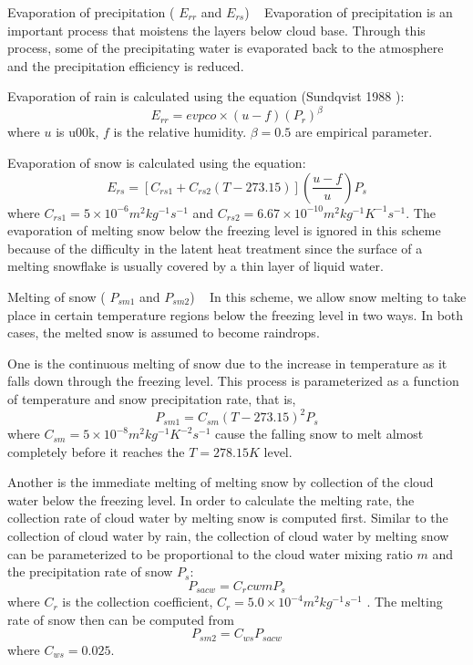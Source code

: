 \begin{DoxyEnumerate}
\begin{DoxyItemize}
\end{DoxyItemize}
\item Evaporation of precipitation ( $E_{rr}$ and $E_{rs}$) ~\newline
 Evaporation of precipitation is an important process that moistens the layers below cloud base. Through this process, some of the precipitating water is evaporated back to the atmosphere and the precipitation efficiency is reduced.
\begin{DoxyItemize}
\item Evaporation of rain is calculated using the equation (Sundqvist 1988 \cite{sundqvist_1988})\+: \[ E_{rr}= evpco \times (u-f)(P_{r})^{\beta} \] where $u$ is u00k, $f$ is the relative humidity. $\beta = 0.5$ are empirical parameter.
\item Evaporation of snow is calculated using the equation\+: \[ E_{rs}=[C_{rs1}+C_{rs2}(T-273.15)](\frac{u-f}{u})P_{s} \] where $C_{rs1}=5\times 10^{-6}m^{2}kg^{-1}s^{-1}$ and $C_{rs2}=6.67\times 10^{-10}m^{2}kg^{-1}K^{-1}s^{-1}$. The evaporation of melting snow below the freezing level is ignored in this scheme because of the difficulty in the latent heat treatment since the surface of a melting snowflake is usually covered by a thin layer of liquid water.
\end{DoxyItemize}
\item Melting of snow ( $P_{sm1}$ and $P_{sm2}$) ~\newline
 In this scheme, we allow snow melting to take place in certain temperature regions below the freezing level in two ways. In both cases, the melted snow is assumed to become raindrops.
\begin{DoxyItemize}
\item One is the continuous melting of snow due to the increase in temperature as it falls down through the freezing level. This process is parameterized as a function of temperature and snow precipitation rate, that is, \[ P_{sm1}=C_{sm}(T-273.15)^{2}P_{s} \] where $C_{sm}=5\times 10^{-8}m^{2}kg^{-1}K^{-2}s^{-1}$ cause the falling snow to melt almost completely before it reaches the $T=278.15 K$ level.
\item Another is the immediate melting of melting snow by collection of the cloud water below the freezing level. In order to calculate the melting rate, the collection rate of cloud water by melting snow is computed first. Similar to the collection of cloud water by rain, the collection of cloud water by melting snow can be parameterized to be proportional to the cloud water mixing ratio $m$ and the precipitation rate of snow $P_{s}$\+: \[ P_{sacw}=C_{r}cwmP_{s} \] where $C_{r}$ is the collection coefficient, $C_{r}=5.0\times 10^{-4}m^{2}kg^{-1}s^{-1}$ . The melting rate of snow then can be computed from \[ P_{sm2}=C_{ws}P_{sacw} \] where $C_{ws}=0.025$.

\end{DoxyItemize}
\end{DoxyEnumerate}

